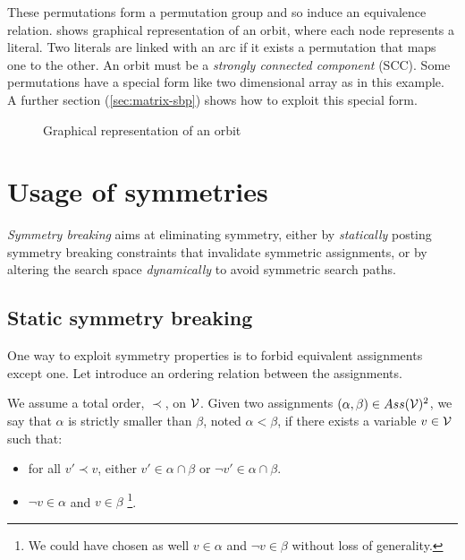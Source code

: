 These permutations form a permutation group and so induce an equivalence relation.
 shows graphical representation of an orbit, where each node represents a literal. Two literals are linked with an arc if it exists a permutation that maps one to the other. 
An orbit must be a \emph{strongly connected component} (SCC).  
Some permutations have a special form like two dimensional
array as in this example.
 A further section (\ref{sec:matrix-sbp}) shows how to exploit this special form.

\begin{figure}[!htbp]
	
	\caption{Graphical representation of an orbit}
	\label{fig:orbit}
\end{figure}



\section{Usage of symmetries}

\emph{Symmetry breaking} aims at eliminating symmetry, either
by \emph{statically} posting symmetry breaking constraints that invalidate symmetric
assignments, or by altering the search space \emph{dynamically} to avoid symmetric search paths.


\subsection{Static symmetry breaking}

One way to exploit symmetry properties is to forbid equivalent assignments except one.
Let introduce an ordering relation between the assignments.

\begin{definition}
	\label{def:assignment_ordering}
	We assume a total order, $\prec$, on $\mathcal{V}$.  Given two assignments $(\alpha,\beta) \in Ass(\mathcal{V})^2 $, 
	we say that $\alpha$ is strictly smaller than $\beta$, noted $\alpha < \beta$, if there exists a variable $v \in \mathcal{V}$
	such that:
	\begin{itemize}
		\item for all $v' \prec v$, either $v' \in \alpha \cap \beta$ or $\neg v' \in \alpha \cap
		\beta$.
		\item $\neg v \in \alpha$ and $v \in \beta$ \footnote{We could have chosen as well 
			$v \in \alpha$ and $\neg v \in \beta$ without loss of generality.}.
	\end{itemize}
\end{definition}


